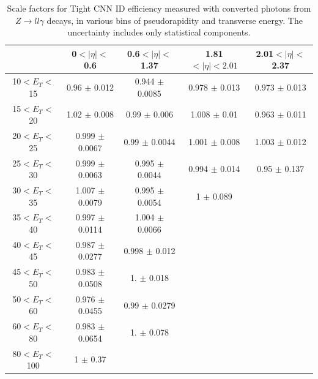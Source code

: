 \begin{table}[htbp]
    \centering
   \begin{tabular}{ccccc}
   \hline\hline
     & 0$<|\eta|<$0.6 & 0.6$<|\eta|<$1.37 & 1.81$<|\eta|<2.01$  & 2.01$<|\eta|<$2.37 \\
    \hline
10$<E_T<$15   & 0.96 $\pm$ 0.012   & 0.944 $\pm$ 0.0085 & 0.978 $\pm$ 0.013  & 0.973 $\pm$ 0.013\\
15$<E_T<$20   & 1.02 $\pm$ 0.008   & 0.99  $\pm$ 0.006  & 1.008 $\pm$ 0.01   & 0.963 $\pm$ 0.011\\
20$<E_T<$25   & 0.999 $\pm$ 0.0067 & 0.99  $\pm$ 0.0044 & 1.001 $\pm$ 0.008  & 1.003 $\pm$ 0.012\\
25$<E_T<$30   & 0.999 $\pm$ 0.0063 & 0.995 $\pm$ 0.0044 & 0.994 $\pm$ 0.014  & 0.95  $\pm$ 0.137\\
30$<E_T<$35   & 1.007 $\pm$ 0.0079 & 0.995 $\pm$ 0.0054 & 1     $\pm$ 0.089  & \\
35$<E_T<$40   & 0.997 $\pm$ 0.0114 & 1.004 $\pm$ 0.0066 &                    & \\
40$<E_T<$45   & 0.987 $\pm$ 0.0277 & 0.998 $\pm$ 0.012  &                    & \\
45$<E_T<$50   & 0.983 $\pm$ 0.0508 & 1.    $\pm$ 0.018  &                    & \\
50$<E_T<$60   & 0.976 $\pm$ 0.0455 & 0.99  $\pm$ 0.0279 &                    & \\
60$<E_T<$80   & 0.983 $\pm$ 0.0654 & 1.    $\pm$ 0.078  &                    & \\
80$<E_T<$100  & 1     $\pm$ 0.37   &                    &                    & \\
\hline\hline
\end{tabular}
\caption{Scale factors for Tight CNN ID efficiency measured with converted photons from $Z\rightarrow ll\gamma$ decays, in various bins of pseudorapidity and transverse energy. The uncertainty includes only statistical components.}
\label{tab:gamma:CNN:Zllg:SF:C}
\end{table}


